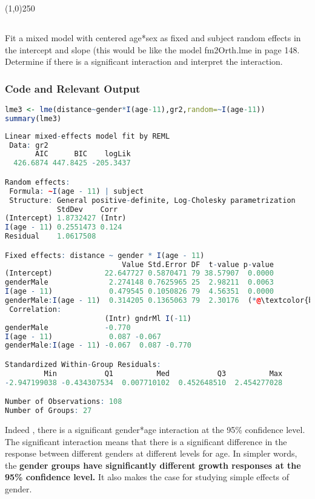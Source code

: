 \documentclass[a4paper]{article}
\begin{document}
\begin{center}
\line(1,0){250}
\end{center}

\subsection{}Fit a mixed model with centered age*sex as fixed and subject random effects in the intercept and slope (this would be like the model fm2Orth.lme in page 148. Determine if there is a significant interaction and interpret the interaction.
\subsubsection{Code and Relevant Output}
\begin{lstlisting}[language=R]
lme3 <- lme(distance~gender*I(age-11),gr2,random=~I(age-11))
summary(lme3)
\end{lstlisting}
\begin{lstlisting}[language=R,frame=none]
Linear mixed-effects model fit by REML
 Data: gr2 
       AIC      BIC    logLik
  426.6874 447.8425 -205.3437

Random effects:
 Formula: ~I(age - 11) | subject
 Structure: General positive-definite, Log-Cholesky parametrization
            StdDev    Corr  
(Intercept) 1.8732427 (Intr)
I(age - 11) 0.2551473 0.124 
Residual    1.0617508       

Fixed effects: distance ~ gender * I(age - 11) 
                           Value Std.Error DF  t-value p-value
(Intercept)            22.647727 0.5870471 79 38.57907  0.0000
genderMale              2.274148 0.7625965 25  2.98211  0.0063
I(age - 11)             0.479545 0.1050826 79  4.56351  0.0000
genderMale:I(age - 11)  0.314205 0.1365063 79  2.30176  (*@\textcolor{blue}{0.0240}@*)
 Correlation: 
                       (Intr) gndrMl I(-11)
genderMale             -0.770              
I(age - 11)             0.087 -0.067       
genderMale:I(age - 11) -0.067  0.087 -0.770

Standardized Within-Group Residuals:
         Min           Q1          Med           Q3          Max 
-2.947199038 -0.434307534  0.007710102  0.452648510  2.454277028 

Number of Observations: 108
Number of Groups: 27 
\end{lstlisting}
Indeed , there is a significant gender*age interaction at the 95\% confidence level. The significant interaction means that there is a significant difference in the response between different genders at different levels for age. In simpler words, the \textbf{gender groups have significantly different growth responses at the 95\% confidence level.} It also makes the case for studying simple effects of gender. 
\end{document}
